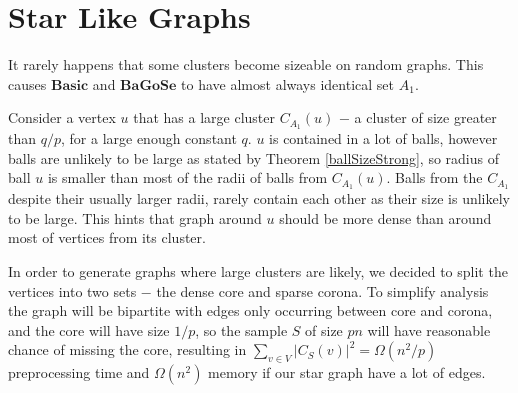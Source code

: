 \documentclass[shortabstract, lic, english]{iithesis}
\theoremstyle{definition} \newtheorem{definition}{Definition}[chapter]
\theoremstyle{plain} \newtheorem{remark}[definition]{Observation}
\theoremstyle{plain} \newtheorem{theorem}[definition]{Theorem}
\theoremstyle{plain} \newtheorem{lemma}[definition]{Lemma}
\theoremstyle{plain} \newtheorem{conjecture}[definition]{Conjecture}
\begin{document}
\section{Star Like Graphs}

It rarely happens that some clusters become sizeable on random graphs.
This causes $\mathbf{Basic}$ and $\mathbf{BaGoSe}$ to have almost always identical set $A_1$.

Consider a vertex $u$ that has a large cluster $C_{A_1}(u)$ $-$ a cluster of size greater than $q/p$, for a large enough constant $q$.
$u$ is contained in a lot of balls, however balls are unlikely to be large as stated by Theorem \ref{ballSizeStrong},
so radius of ball $u$ is smaller than most of the radii of balls from $C_{A_1}(u)$. Balls from the $C_{A_1}$ despite their usually larger radii,
rarely contain each other as their size is unlikely to be large. This hints that graph around $u$ should be more dense than around most of vertices from its cluster.

In order to generate graphs where large clusters are likely, we decided to split the vertices into two sets $-$ the dense core and sparse corona.
To simplify analysis the graph will be bipartite with edges only occurring between core and corona,
and the core will have size $1/p$, so the sample $S$ of size $p  n$ will have reasonable chance of missing the core,
resulting in $\sum_{v \in V}|C_S(v)|^2 = \Omega(n^2/p)$ preprocessing time and $\Omega(n^2)$ memory if our star graph have a lot of edges.
\end{document}
